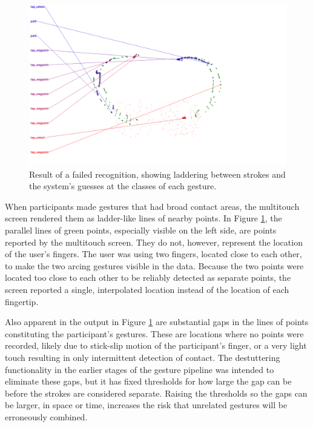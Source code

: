 \begin{figure}
	\centering
	\includegraphics[width=\textwidth]{../../software/tool/test_pipeline/good_run/u10_c1000_t6/u10_c1000_t6_gestures.png}
	\caption{Result of a failed recognition, showing laddering between strokes and the system's guesses at the classes of each gesture.}
	\label{recognizer_fail_1}
\end{figure}

When participants made gestures that had broad contact areas, the multitouch screen rendered them as ladder-like lines of nearby points. 
In Figure \ref{recognizer_fail_1}, the parallel lines of green points, especially visible on the left side, are points reported by the multitouch screen. 
They do not, however, represent the location of the user's fingers.
The user was using two fingers, located close to each other, to make the two arcing gestures visible in the data. 
Because the two points were located too close to each other to be reliably detected as separate points, the screen reported a single, interpolated location instead of the location of each fingertip. 

Also apparent in the output in Figure \ref{recognizer_fail_1} are substantial gaps in the lines of points constituting the participant's gestures. 
These are locations where no points were recorded, likely due to stick-slip motion of the participant's finger, or a very light touch resulting in only intermittent detection of contact. 
The destuttering functionality in the earlier stages of the gesture pipeline was intended to eliminate these gaps, but it has fixed thresholds for how large the gap can be before the strokes are considered separate. 
Raising the thresholds so the gaps can be larger, in space or time, increases the risk that unrelated gestures will be erroneously combined.


